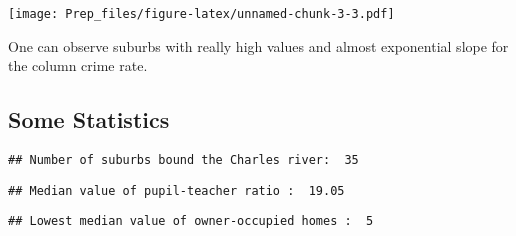 \documentclass[]{article}
\newenvironment{Shaded}{\begin{snugshade}}{\end{snugshade}}
\newcommand{\DecValTok}[1]{\textcolor[rgb]{0.00,0.00,0.81}{#1}}
\newcommand{\KeywordTok}[1]{\textcolor[rgb]{0.13,0.29,0.53}{\textbf{#1}}}
\newcommand{\NormalTok}[1]{#1}
\newcommand{\OperatorTok}[1]{\textcolor[rgb]{0.81,0.36,0.00}{\textbf{#1}}}
\newcommand{\StringTok}[1]{\textcolor[rgb]{0.31,0.60,0.02}{#1}}
\begin{document}
\texttt{[image: Prep\_files/figure-latex/unnamed-chunk-3-3.pdf]}

One can observe suburbs with really high values and almost exponential
slope for the column crime rate.

\hypertarget{some-statistics}{%
\subsection{Some Statistics}\label{some-statistics}}

\begin{Shaded}
\end{Shaded}

\begin{verbatim}
## Number of suburbs bound the Charles river:  35
\end{verbatim}

\begin{Shaded}
\end{Shaded}

\begin{verbatim}
## Median value of pupil-teacher ratio :  19.05
\end{verbatim}

\begin{Shaded}
\end{Shaded}

\begin{verbatim}
## Lowest median value of owner-occupied homes :  5
\end{verbatim}

\begin{Shaded}
\end{Shaded}
\end{document}
